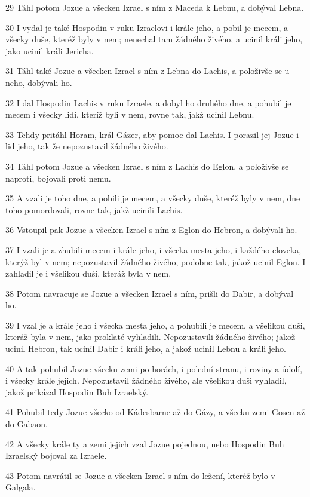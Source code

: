 \par 29 Táhl potom Jozue a všecken Izrael s ním z Maceda k Lebnu, a dobýval Lebna.
\par 30 I vydal je také Hospodin v ruku Izraelovi i krále jeho, a pobil je mecem, a všecky duše, kteréž byly v nem; nenechal tam žádného živého, a ucinil králi jeho, jako ucinil králi Jericha.
\par 31 Táhl také Jozue a všecken Izrael s ním z Lebna do Lachis, a položivše se u neho, dobývali ho.
\par 32 I dal Hospodin Lachis v ruku Izraele, a dobyl ho druhého dne, a pohubil je mecem i všecky lidi, kteríž byli v nem, rovne tak, jakž ucinil Lebnu.
\par 33 Tehdy pritáhl Horam, král Gázer, aby pomoc dal Lachis. I porazil jej Jozue i lid jeho, tak že nepozustavil žádného živého.
\par 34 Táhl potom Jozue a všecken Izrael s ním z Lachis do Eglon, a položivše se naproti, bojovali proti nemu.
\par 35 A vzali je toho dne, a pobili je mecem, a všecky duše, kteréž byly v nem, dne toho pomordovali, rovne tak, jakž ucinili Lachis.
\par 36 Vstoupil pak Jozue a všecken Izrael s ním z Eglon do Hebron, a dobývali ho.
\par 37 I vzali je a zhubili mecem i krále jeho, i všecka mesta jeho, i každého cloveka, kterýž byl v nem; nepozustavil žádného živého, podobne tak, jakož ucinil Eglon. I zahladil je i všelikou duši, kteráž byla v nem.
\par 38 Potom navracuje se Jozue a všecken Izrael s ním, prišli do Dabir, a dobýval ho.
\par 39 I vzal je a krále jeho i všecka mesta jeho, a pohubili je mecem, a všelikou duši, kteráž byla v nem, jako proklaté vyhladili. Nepozustavili žádného živého; jakož ucinil Hebron, tak ucinil Dabir i králi jeho, a jakož ucinil Lebnu a králi jeho.
\par 40 A tak pohubil Jozue všecku zemi po horách, i polední stranu, i roviny a údolí, i všecky krále jejich. Nepozustavil žádného živého, ale všelikou duši vyhladil, jakož prikázal Hospodin Buh Izraelský.
\par 41 Pohubil tedy Jozue všecko od Kádesbarne až do Gázy, a všecku zemi Gosen až do Gabaon.
\par 42 A všecky krále ty a zemi jejich vzal Jozue pojednou, nebo Hospodin Buh Izraelský bojoval za Izraele.
\par 43 Potom navrátil se Jozue a všecken Izrael s ním do ležení, kteréž bylo v Galgala.

